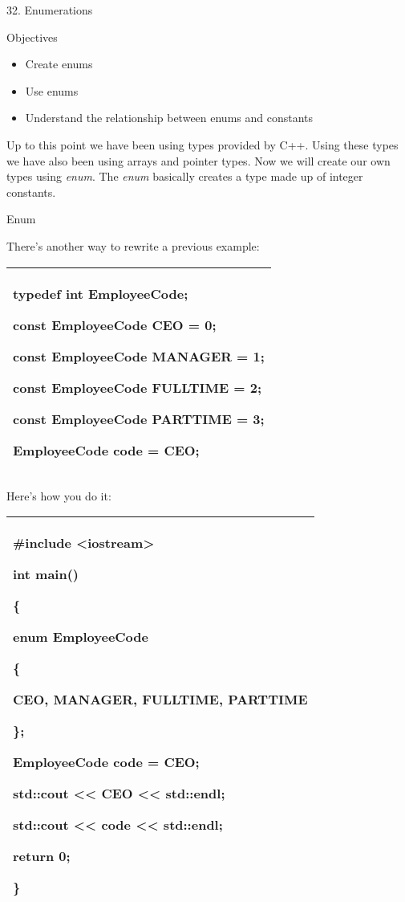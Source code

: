 \documentclass[
]{article}
\author{}
\date{}
\providecommand{\tightlist}{%
  \setlength{\itemsep}{0pt}\setlength{\parskip}{0pt}}
\begin{document}
32. Enumerations

Objectives

\begin{itemize}
\tightlist
\item
  Create enums
\item
  Use enums
\item
  Understand the relationship between enums and constants
\end{itemize}

Up to this point we have been using types provided by C++. Using these
types we have also been using arrays and pointer types. Now we will
create our own types using \emph{enum}. The \emph{enum} basically
creates a type made up of integer constants.

Enum

There's another way to rewrite a previous example:

\begin{longtable}[]{@{}l@{}}
\toprule
\endhead
\begin{minipage}[t]{0.97\columnwidth}\raggedright
typedef int EmployeeCode;

const EmployeeCode CEO = 0;

const EmployeeCode MANAGER = 1;

const EmployeeCode FULLTIME = 2;

const EmployeeCode PARTTIME = 3;

EmployeeCode code = CEO;\strut
\end{minipage}\tabularnewline
\bottomrule
\end{longtable}

Here's how you do it:

\begin{longtable}[]{@{}l@{}}
\toprule
\endhead
\begin{minipage}[t]{0.97\columnwidth}\raggedright
\#include \textless iostream\textgreater{}

int main()

\{

\emph{ }enum EmployeeCode

\{

CEO, MANAGER, FULLTIME, PARTTIME

\};

EmployeeCode code = CEO;

std::cout \textless\textless{} CEO \textless\textless{} std::endl;

std::cout \textless\textless{} code \textless\textless{} std::endl;

return 0;

\}\strut
\end{minipage}\tabularnewline
\bottomrule
\end{longtable}
\end{document}
